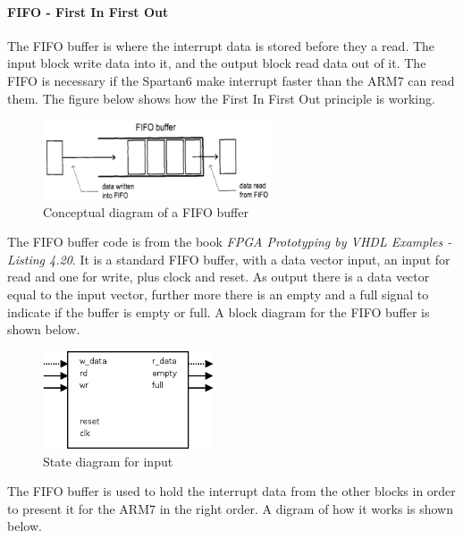 \paragraph{FIFO - First In First Out}
The FIFO buffer is where the interrupt data is stored before they a read. The input block write data into it, and the output block read data out of it. The FIFO is necessary if the Spartan6 make interrupt faster than the ARM7 can read them. The figure below shows how the First In First Out principle is working.
\begin{figure}[H]
	\begin{centering}
		\includegraphics[width=0.6\textwidth]{images/tb5_fifo.png}
		\caption{Conceptual diagram of a FIFO buffer}
	\end{centering}
\end{figure}
The FIFO buffer code is from the book \textit{FPGA Prototyping by VHDL Examples - Listing 4.20}. It is a standard FIFO buffer, with a data vector input, an input for read and one for write, plus clock and reset. As output there is a data vector equal to the input vector, further more there is an empty and a full signal to indicate if the buffer is empty or full. A block diagram for the FIFO buffer is shown below.
\begin{figure}[H]
	\begin{centering}
		\includegraphics[width=0.45\textwidth]{images/tb5_fifo_block.png}
		\caption{State diagram for input}
	\end{centering}
\end{figure}
The FIFO buffer is used to hold the interrupt data from the other blocks in order to present it for the ARM7 in the right order. A digram of how it works is shown below.
